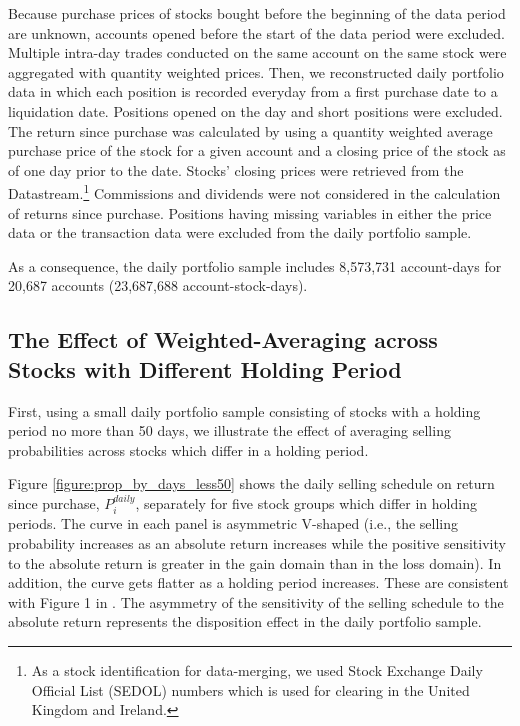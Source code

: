 \documentclass[11pt, a4paper]{article}
\begin{document}
Because purchase prices of stocks bought before the beginning of the data period are unknown, accounts opened before the start of the data period were excluded. Multiple intra-day trades conducted on the same account on the same stock were aggregated with quantity weighted prices. Then, we reconstructed daily portfolio data in which each position is recorded everyday from a first purchase date to a liquidation date. Positions opened on the day and short positions were excluded.
The return since purchase was calculated by using a quantity weighted average purchase price of the stock for a given account and a closing price of the stock as of one day prior to the date. Stocks' closing prices were retrieved from the Datastream.\footnote{As a stock identification for data-merging, we used Stock Exchange Daily Official List (SEDOL) numbers which is used for clearing in the United Kingdom and Ireland.} Commissions and dividends were not considered in the calculation of returns since purchase. Positions having missing variables in either the price data or the transaction data were excluded from the daily portfolio sample.
	
As a consequence, the daily portfolio sample includes 8,573,731 account-days for 20,687 accounts (23,687,688 account-stock-days).


\subsection{The Effect of Weighted-Averaging across Stocks with Different Holding Period}
\label{section:ave}
First, using a small daily portfolio sample consisting of stocks with a holding period no more than 50 days, we illustrate the effect of averaging selling probabilities across stocks which differ in a holding period.

Figure \ref{figure:prop_by_days_less50} shows the daily selling schedule on return since purchase, $P^{daily}_{i}$, separately for five stock groups which differ in holding periods. The curve in each panel is asymmetric V-shaped (i.e., the selling probability increases as an absolute return increases while the positive sensitivity to the absolute return is greater in the gain domain than in the loss domain). In addition, the curve gets flatter as a holding period increases. These are consistent with Figure 1 in \citet{BenDavidHirshleifer12}. The asymmetry of the sensitivity of the selling schedule to the absolute return represents the disposition effect in the daily portfolio sample.
\end{document}
